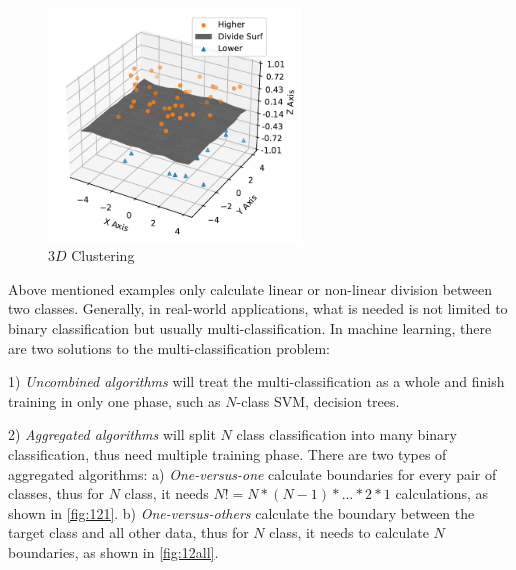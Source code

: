 \begin{spacing}{1.5}
% 

\begin{figure}[ht]
\centering
\includegraphics[width=0.6\textwidth, fbox]{Chapter2/3dcluster.pdf}
\caption{$3D$ Clustering}
\label{fig:3dcluster} 
\end{figure}

Above mentioned examples only calculate linear or non-linear division between two classes. Generally, in real-world applications, what is needed is not limited to binary classification but usually multi-classification. In machine learning, there are two solutions to the multi-classification problem: 

1) \textit{Uncombined algorithms} will treat the multi-classification as a whole and finish training in only one phase, such as $N$-class SVM, decision trees. 

2) \textit{Aggregated algorithms} will split $N$ class classification into many binary classification, thus need multiple training phase. There are two types of aggregated algorithms: a) \textit{One-versus-one} calculate boundaries for every pair of classes, thus for $N$ class, it needs $N!=N*(N-1)*...*2*1$ calculations, as shown in \autoref{fig:121}. b) \textit{One-versus-others} calculate the boundary between the target class and all other data, thus for $N$ class, it needs to calculate $N$ boundaries, as shown in \autoref{fig:12all}. 


\end{spacing}
